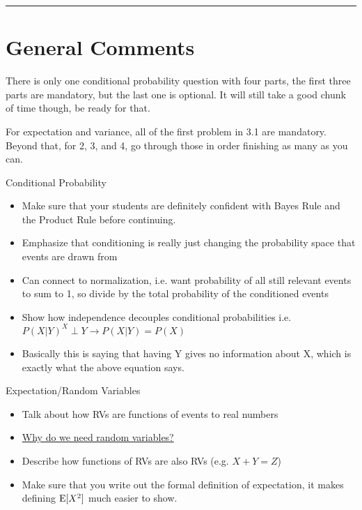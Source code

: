 \documentclass{exam}
\title{}
\date{Random Variables, Conditional Probability, Distributions}
\begin{document}
\maketitle
\rule{\textwidth}{0.15em}
\fontsize{12}{15}\selectfont
\thispagestyle{empty}


\section{General Comments}
\begin{questions}
\item There is only one conditional probability question with four parts, the first three parts are mandatory, but the last one is optional. It will still take a good chunk of time though, be ready for that.
\item For expectation and variance, all of the first problem in 3.1 are mandatory. Beyond that, for 2, 3, and 4, go through those in order finishing as many as you can.
\item Conditional Probability
\begin{itemize}
\item Make sure that your students are definitely confident with Bayes Rule and the Product Rule before continuing. 
\item Emphasize that conditioning is really just changing the probability space that events are drawn from
\item Can connect to normalization, i.e. want probability of all still relevant events to sum to 1, so divide by the total probability of the conditioned events 
\item Show how independence decouples conditional probabilities 
i.e. $P(X|Y) ^ X \perp Y \rightarrow P(X|Y) = P(X)$
\item Basically this is saying that having Y gives no information about X, which is exactly what the above equation says.
\end{itemize}
\item Expectation/Random Variables
\begin{itemize}
\item Talk about how RVs are functions of events to real numbers
\item \href{http://mathoverflow.net/questions/250500/why-do-we-need-random-variables}{Why do we need random variables?}
\item Describe how functions of RVs are also RVs (e.g. $X + Y = Z$)
\item Make sure that you write out the formal definition of expectation, it makes defining $\text{E}[X^2]$ much easier to show.

\end{itemize}
\end{questions}
\end{document}
